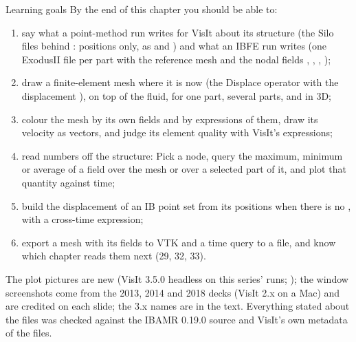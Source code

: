 \documentclass[aspectratio=169,11pt]{beamer}
\begin{document}
\begin{frame}{Learning goals}
\label{fr:goals}
\footnotesize By the end of this chapter you should be able to:
\begin{enumerate}
  \item say what a point-method run writes for VisIt about its structure (the Silo files behind : positions only, as  and ) and what an IBFE run writes (one ExodusII file per part with the reference mesh and the nodal fields , , , );
  \item draw a finite-element mesh where it is now (the Displace operator with the displacement ), on top of the fluid, for one part, several parts, and in 3D;
  \item colour the mesh by its own fields and by expressions of them, draw its velocity as vectors, and judge its element quality with VisIt's  expressions;
  \item read numbers off the structure: Pick a node, query the maximum, minimum or average of a field over the mesh or over a selected part of it, and plot that quantity against time;
  \item build the displacement of an IB point set from its positions when there is no , with a cross-time expression;
  \item export a mesh with its fields to VTK and a time query to a  file, and know which chapter reads them next (29, 32, 33).
\end{enumerate}
\begin{punchbox}
\scriptsize The plot pictures are new (VisIt 3.5.0 headless on this series' runs; ); the window screenshots come from the 2013, 2014 and 2018 decks (VisIt 2.x on a Mac) and are credited on each slide; the 3.x names are in the text. Everything stated about the files was checked against the IBAMR 0.19.0 source and VisIt's own metadata of the files.
\end{punchbox}
\end{frame}
\end{document}
